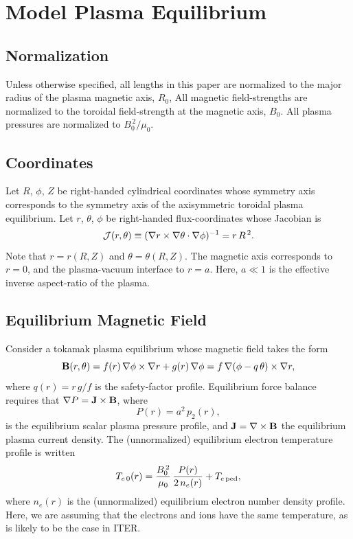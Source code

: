 \documentclass{iopjournal}
\begin{document}
\section{Model Plasma Equilibrium}\label{s2}
\subsection{Normalization}\label{norm}
Unless otherwise specified, all lengths in this paper are normalized to  the major radius of the plasma magnetic axis, $R_0$, All  magnetic field-strengths
are normalized to the  toroidal field-strength at the magnetic axis, $B_0$. All plasma pressures are normalized to $B_0^{\,2}/\mu_0$.

\subsection{Coordinates}\label{coord}
Let $R$, $\phi$, $Z$ be right-handed cylindrical coordinates whose symmetry axis corresponds to the symmetry axis of the axisymmetric toroidal plasma equilibrium.
Let $r$, $\theta$, $\phi$ be right-handed flux-coordinates whose
Jacobian is
\begin{equation}\label{jac}
{\cal J}(r,\theta)\equiv (\nabla r\times \nabla\theta\cdot\nabla\phi)^{-1}= r\,R^{\,2}.
\end{equation}
Note that $r=r(R,Z)$ and $\theta=\theta(R,Z)$. 
The magnetic axis corresponds to $r=0$, and the plasma-vacuum interface to $r=a$. Here, $a\ll 1$ is the effective inverse aspect-ratio of the plasma. 

\subsection{Equilibrium Magnetic Field}\label{equilb}
Consider a tokamak plasma equilibrium whose magnetic field takes the form
\begin{equation}
{\bf B}(r,\theta) = f(r)\,\nabla\phi\times \nabla r + g(r)\,\nabla\phi = f\,\nabla(\phi-q\,\theta)\times \nabla r,
\end{equation}
where
$q(r) = r\,g/f$ is the safety-factor profile.
Equilibrium force balance requires that
$ \nabla P={\bf J}\times {\bf B}$, 
where 
\begin{equation}
P(r)= a^2\,p_2(r),
\end{equation}
 is the equilibrium scalar plasma pressure profile, and ${\bf J}=\nabla\times {\bf B}$ the equilibrium plasma current density. 
 The (unnormalized) equilibrium electron temperature profile is written
 \begin{equation}
 T_{e\,0}(r) = \frac{B_0^{\,2}}{\mu_0}\,\frac{P(r)}{2\,n_e(r)} + T_{e\,{\rm ped}},
 \end{equation}
 where $n_e(r)$ is the (unnormalized) equilibrium electron number density profile. Here, we are assuming that the electrons and ions have the same
 temperature, as is likely to be the case in ITER. 
\end{document}
